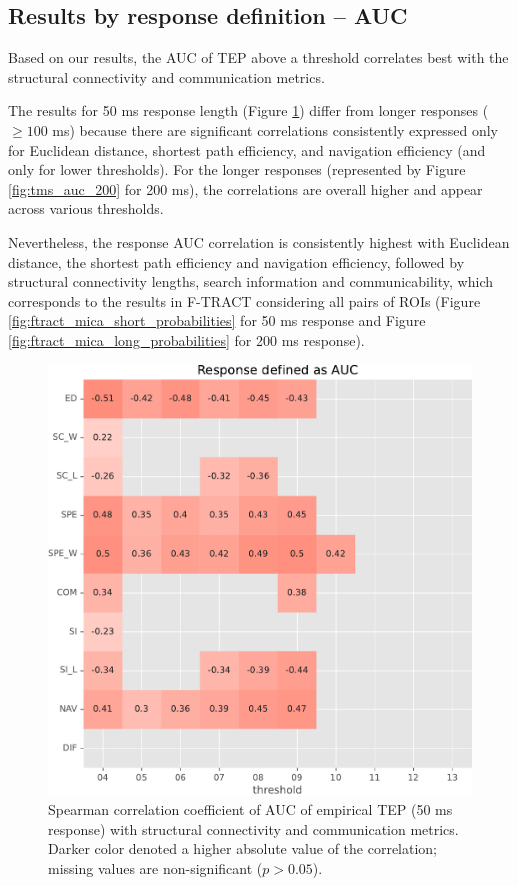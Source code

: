 \subsection{Results by response definition -- AUC}

Based on our results, the AUC of TEP above a threshold correlates best with the structural connectivity and communication metrics.

The results for 50 ms response length (Figure \ref{fig:tms_auc_50}) differ from longer responses ($\geq100$ ms) because there are significant correlations consistently expressed only for Euclidean distance, shortest path efficiency, and navigation efficiency (and only for lower thresholds). For the longer responses (represented by Figure \ref{fig:tms_auc_200} for 200 ms), the correlations are overall higher and appear across various thresholds. 

Nevertheless, the response AUC correlation is consistently highest with Euclidean distance, the shortest path efficiency and navigation efficiency, followed by structural connectivity lengths, search information and communicability, which corresponds to the results in F-TRACT considering all pairs of ROIs (Figure \ref{fig:ftract_mica_short_probabilities} for 50 ms response and Figure \ref{fig:ftract_mica_long_probabilities} for 200 ms response).

\begin{figure}
    \centering
    \includegraphics[width=\textwidth]{images/nootebook_generated/pytepfit_results/empirical/50/not_over_threshold_nan/Response defined as AUC.pdf}
    \caption[TEPs AUC (50 ms) correlation with SC and communication metrics]{Spearman correlation coefficient of AUC of empirical TEP (50 ms response) with structural connectivity and communication metrics. Darker color denoted a higher absolute value of the correlation; missing values are non-significant ($p>0.05$).}
    \label{fig:tms_auc_50}
\end{figure}

